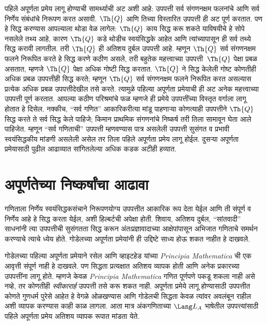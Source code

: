 पहिले अपूर्णता प्रमेय लागू होण्याची सामर्थ्याची अट अशी आहे: उपपत्ती
सर्व संगणनक्षम फलनांचे आणि सर्व निर्णेय संबंधांचे निरूपण
करत असावी. $\Th{Q}$ आणि तिच्या विस्तारित उपपत्ती ही अट पूर्ण करतात.
पण हे सिद्ध करण्यास आपल्याला थोडा वेळ लागेल: $\Th{Q}$ काय
सिद्ध करू शकते याविषयीचे हे सोपे नसलेले तथ्य आहे, कारण $\Th{Q}$ कडे
थोडीच स्वयंसिद्धके आहेत आणि त्यांच्यापासून ही सर्व तथ्ये सिद्ध
करावी लागतील. तरी $\Th{Q}$ ही अतिशय दुर्बल उपपत्ती आहे.
म्हणून $\Th{Q}$ सर्व संगणनक्षम फलने निरूपित करते हे सिद्ध
करणे कठीण असले, तरी बहुतेक महत्त्वाच्या उपपत्ती~$\Th{Q}$ पेक्षा
प्रबळ असतात, म्हणजे $\Th{Q}$ पेक्षा अधिक गोष्टी सिद्ध करतात.
$\Th{Q}$ ने सिद्ध केलेली गोष्ट कोणतीही अधिक प्रबळ उपपत्तीही
सिद्ध करते; म्हणून $\Th{Q}$ सर्व संगणनक्षम फलने निरूपित करत
असल्यास प्रत्येक अधिक प्रबळ उपपत्तीदेखील तसे करते. त्यामुळे
पहिल्या अपूर्णता प्रमेयाची ही अट अनेक महत्त्वाच्या उपपत्ती पूर्ण करतात.
आपल्या कठीण परिश्रमांचे फळ म्हणजे ही प्रमेये उपपत्तींच्या विस्तृत
वर्गाला लागू होतात हे दिसेल. नक्कीच, ``सर्व गणित'' आकारिकरीत्या
मांडू पाहणाऱ्या कोणत्याही उपपत्तीने $\Th{Q}$ सिद्ध करते ते
सर्व सिद्ध केले पाहिजे; किमान प्राथमिक संगणनांचे निष्कर्ष तरी
तिला सामावून घेता आले पाहिजेत. म्हणून ``सर्व गणिताची'' उपपत्ती
म्हणवण्यास पात्र असलेली उपपत्ती सुसंगत व प्रभावी स्वयंसिद्धकीय
मांडणी असलेली असेल तर तिला पहिले अपूर्णता प्रमेय लागू होईल.
दुसऱ्या अपूर्णता प्रमेयासाठी पुढील आढाव्यात सांगितलेल्या अधिक
कडक अटीही हव्यात.














\section{अपूर्णतेच्या निष्कर्षांचा आढावा}\label{inc:int:ovr:sec}

गणिताला निर्णेय स्वयंसिद्धकसंचाने निरूपणयोग्य उपपत्तीत
आकारिक रूप देता येईल आणि ती संपूर्ण व निर्णेय आहे हे
सिद्ध करता येईल, अशी हिल्बर्टची अपेक्षा होती. शिवाय, अतिशय दुर्बल,
``सांतवादी'' साधनांनी त्या उपपत्तीची सुसंगतता सिद्ध करून
अंतःप्रज्ञावादाच्या आक्षेपांपासून अभिजात गणिताचे समर्थन करण्याचे
त्याचे ध्येय होते. गोडेलच्या अपूर्णता प्रमेयांनी ही उद्दिष्टे
साध्य होऊ शकत नाहीत हे दाखवले.

गोडेलच्या पहिल्या अपूर्णता प्रमेयाने रसेल आणि व्हाइटहेड यांच्या
\emph{Principia Mathematica} ची एक आवृत्ती संपूर्ण नाही हे
दाखवले. पण सिद्धता प्रत्यक्षात अतिशय व्यापक होती आणि अनेक प्रकारच्या
उपपत्तींना लागू होते. म्हणजे केवळ \emph{Principia Mathematica}
गणित पूर्णपणे पकडू शकला नाही असे नव्हे, तर कोणतीही \emph{स्वीकारार्ह}
उपपत्ती तसे करू शकत नाही. अपूर्णता प्रमेये लागू होण्यासाठी उपपत्तीत
कोणते गुणधर्म पुरेसे आहेत हे वेगळे ओळखण्यास आणि गोडेलची सिद्धता
केवळ त्यांवर अवलंबून राहील अशी व्यापक करण्यास काही काळ लागला.
आता मात्र अंकगणिताच्या $\Lang L_A$ भाषेतील उपपत्त्यांसाठी पहिले
अपूर्णता प्रमेय अतिशय व्यापक रूपात मांडता येते.


